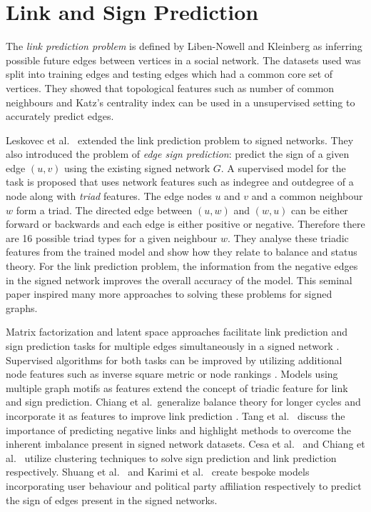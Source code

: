\section{Link and Sign Prediction}
\label{sec:link-prediction}
The \textit{link prediction problem} is defined by Liben-Nowell and Kleinberg \cite{liben-nowell2007the} as inferring possible future edges between vertices in a social network.
The datasets used was split into training edges and testing edges which had a common core set of vertices.
They showed that topological features such as number of common neighbours and Katz's centrality index can be used in a unsupervised setting to accurately predict edges.

Leskovec et al.\ \cite{leskovec2010predicting} extended the link prediction problem to signed networks.
They also introduced the problem of \textit{edge sign prediction}: predict the sign of a given edge $(u,v)$ using the existing signed network $G$.
A supervised model for the task is proposed that uses network features such as indegree and outdegree of a node along with \textit{triad} features.
The edge nodes $u$ and $v$ and a common neighbour $w$ form a triad.
The directed edge between $(u,w)$ and $(w,u)$ can be either forward or backwards and each edge is either positive or negative.
Therefore there are 16 possible triad types for a given neighbour $w$.
They analyse these triadic features from the trained model and show how they relate to balance and status theory.
For the link prediction problem, the information from the negative edges in the signed network improves the overall accuracy of the model.
This seminal paper inspired many more approaches to solving these problems for signed graphs.   

Matrix factorization and latent space approaches facilitate link prediction and sign prediction tasks for multiple edges simultaneously in a signed network \cite{agrawal2013link,hsieh2012low,gu2019link}.
Supervised algorithms for both tasks can be improved by utilizing additional node features such as inverse square metric \cite{ahmadalinezhad2018sign} or node rankings \cite{shahriari2014ranking}.
Models using multiple graph motifs as features \cite{Liu2019LinkPrediction,khodadadi2017sign} extend the concept of triadic feature for link and sign prediction.
Chiang et al.\ generalize balance theory for longer cycles and incorporate it as features to improve link prediction \cite{chiang2011exploiting}.
Tang et al.\ \cite{Jiliang2015Negative} discuss the importance of predicting negative links and highlight methods to overcome the inherent imbalance present in signed network datasets.
Cesa et al.\ \cite{cesa2012correlation} and Chiang et al.\ \cite{chiang2014prediction} utilize clustering techniques to solve sign prediction and link prediction respectively.
Shuang et al.\ \cite{Shuang-Hong2012Friend} and Karimi et al.\ \cite{karimi2019multicongress} create bespoke models incorporating user behaviour and political party affiliation respectively to predict the sign of edges present in the signed networks.

